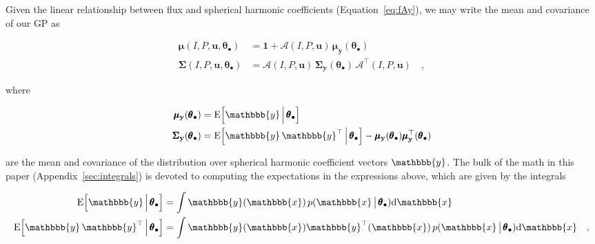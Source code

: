 \documentclass[modern,linenumbers]{aastex62}
\begin{document}
%
Given the linear relationship between flux and spherical harmonic
coefficients (Equation~\ref{eq:fAy}),
we may write the mean and covariance of our GP as
%
\begin{linenomath}\begin{align}
        \label{eq:mean_f}
        \pmb{\mu}(I, P, \mathbf{u}, \pmb{\theta}_\bullet)
         & = \mathbf{1} + \pmb{\mathcal{A}}(I, P, \mathbf{u}) \, \pmb{\mu}_{\mathbf{y}}(\pmb{\theta}_\bullet)
        \\
        \label{eq:cov_f}
        \pmb{\Sigma}(I, P, \mathbf{u}, \pmb{\theta}_\bullet)
         & = \pmb{\mathcal{A}}(I, P, \mathbf{u}) \, \pmb{\Sigma}_{\mathbf{y}}(\pmb{\theta}_\bullet) \, \pmb{\mathcal{A}}^\top(I, P, \mathbf{u})
        \quad,
    \end{align}\end{linenomath}
%
where
%
\begin{linenomath}\begin{align}
        \label{eq:mean_y}
        \pmb{\mu}_{\mathbf{y}}(\pmb{\theta}_\bullet)
         & = \mathrm{E} \Big[ \mathbbb{y} \, \Big| \, \pmb{\theta}_\bullet \Big]
        \\
        \label{eq:cov_y}
        \pmb{\Sigma}_{\mathbf{y}}(\pmb{\theta}_\bullet)
         & = \mathrm{E} \Big[ \mathbbb{y} \, \mathbbb{y}^\top \, \Big| \, \pmb{\theta}_\bullet \Big] - \pmb{\mu}_{\mathbf{y}}(\pmb{\theta}_\bullet) \pmb{\mu}_{\mathbf{y}}^\top(\pmb{\theta}_\bullet)
    \end{align}\end{linenomath}
%
are the mean and covariance of the distribution over spherical harmonic coefficient
vectors $\mathbbb{y}$.
The bulk of the math in this paper (Appendix~\ref{sec:integrals})
is devoted to computing
the expectations in the expressions above, which
are given by the integrals
%
\begin{linenomath}\begin{align}
        \label{eq:exp_y}
        \mathrm{E} \Big[ \mathbbb{y} \, \Big| \, \pmb{\theta}_\bullet \Big]
         & =
        \int \mathbbb{y}(\mathbbb{x} ) \, p(\mathbbb{x} \, \big| \, \pmb{\theta}_\bullet)\mathrm{d}\mathbbb{x}
        \\
        \label{eq:exp_yy}
        \mathrm{E} \Big[ \mathbbb{y} \, \mathbbb{y}^\top \, \Big| \, \pmb{\theta}_\bullet \Big]
         & =
        \int \mathbbb{y}(\mathbbb{x} ) \mathbbb{y}^\top(\mathbbb{x} ) \, p(\mathbbb{x} \, \big| \, \pmb{\theta}_\bullet)\mathrm{d}\mathbbb{x}
        \quad,
    \end{align}\end{linenomath}
\end{document}

